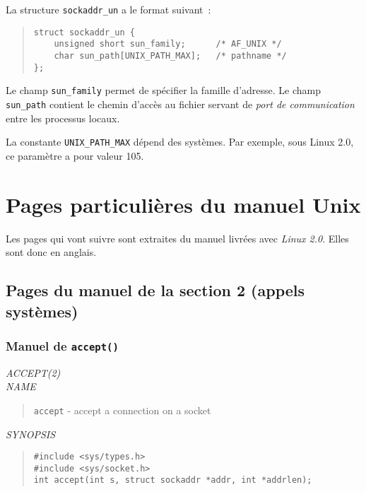 \begin{appendix}
La structure {\tt sockaddr\_un} a le format suivant~:
\begin{quote}
\begin{verbatim}
struct sockaddr_un {
    unsigned short sun_family;      /* AF_UNIX */
    char sun_path[UNIX_PATH_MAX];   /* pathname */
};
\end{verbatim}
\end{quote}

Le champ {\tt sun\_family} permet de sp{\'e}cifier la famille d'adresse. Le
champ {\tt sun\_path} contient le chemin d'acc{\`e}s au fichier servant de {\sl port de communication}
entre les processus locaux.

\begin{remarque}
La constante {\tt UNIX\_PATH\_MAX} d{\'e}pend des syst{\`e}mes. Par exemple, sous
Linux 2.0, ce param{\`e}tre a pour valeur 105.
\end{remarque}

\chapter{\label{ann-part-manunix}Pages particuli{\`e}res du manuel {\sc Unix}}

Les pages qui vont suivre sont extraites du manuel {\Unix} livr{\'e}es
avec {\sl Linux 2.0}. Elles sont donc en anglais.

\section{Pages du manuel de la section 2 (appels syst{\`e}mes)}

\subsection{Manuel de {\tt accept()}}
\begin{english}
{\sl ACCEPT(2)}\\

{\sl NAME}
\begin{quote}
 {\tt accept} - accept a connection on a socket
\end{quote}

{\sl SYNOPSIS}
\begin{quote}
\begin{verbatim}
#include <sys/types.h>
#include <sys/socket.h>
int accept(int s, struct sockaddr *addr, int *addrlen);
\end{verbatim}
\end{quote}


\end{english}
\end{appendix}
